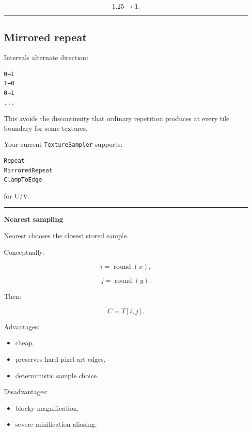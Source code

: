 \[
1.25\rightarrow1.
\]

\begin{center}\rule{0.5\linewidth}{0.5pt}\end{center}

\subsection{Mirrored repeat}\label{03-visual-computing-i-ch019-mirrored-repeat}

\hypertarget{03-visual-computing-i-ch019-mirrored-repeat}{}

Intervals alternate direction:

\begin{verbatim}
0→1
1→0
0→1
...
\end{verbatim}

This avoids the discontinuity that ordinary repetition produces at every tile boundary for some textures.

Your current \texttt{TextureSampler} supports:

\begin{verbatim}
Repeat
MirroredRepeat
ClampToEdge
\end{verbatim}

for U/V.

\begin{center}\rule{0.5\linewidth}{0.5pt}\end{center}

\textbf{Nearest sampling}

Nearest chooses the closest stored sample.

Conceptually:

\[
i=\operatorname{round}(x),
\]

\[
j=\operatorname{round}(y).
\]

Then:

\[
C=T[i,j].
\]

Advantages:

\begin{itemize}
\tightlist
\item
  cheap,
\item
  preserves hard pixel-art edges,
\item
  deterministic sample choice.
\end{itemize}

Disadvantages:

\begin{itemize}
\tightlist
\item
  blocky magnification,
\item
  severe minification aliasing.
\end{itemize}

